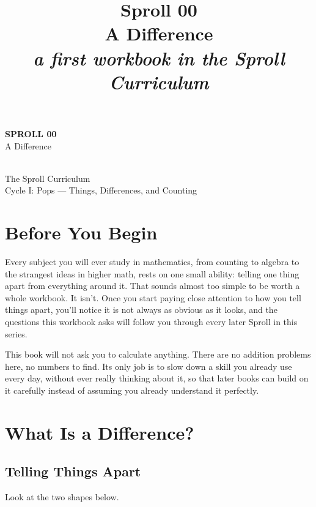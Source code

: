 \documentclass[11pt]{book}
\title{\textbf{Sproll 00}\\[0.3em]\Large A Difference\\[0.5em]\normalsize\textit{a first workbook in the Sproll Curriculum}}
\author{}
\date{}
\begin{document}
\begin{titlepage}
\centering
\vspace*{1.5in}
{\Huge \textbf{SPROLL 00}}\\[0.5in]
{\huge A Difference}\\[0.8in]
\\[0.8in]
{\Large The Sproll Curriculum}\\[0.2in]
{\large Cycle I: Pops --- Things, Differences, and Counting}
\end{titlepage}

\tableofcontents

\chapter*{Before You Begin}

Every subject you will ever study in mathematics, from counting to algebra to the strangest ideas in higher math, rests on one small ability: telling one thing apart from everything around it. That sounds almost too simple to be worth a whole workbook. It isn't. Once you start paying close attention to how you tell things apart, you'll notice it is not always as obvious as it looks, and the questions this workbook asks will follow you through every later Sproll in this series.

This book will not ask you to calculate anything. There are no addition problems here, no numbers to find. Its only job is to slow down a skill you already use every day, without ever really thinking about it, so that later books can build on it carefully instead of assuming you already understand it perfectly.

\chapter{What Is a Difference?}

\section{Telling Things Apart}

Look at the two shapes below.

\begin{center}
\end{center}
\end{document}
